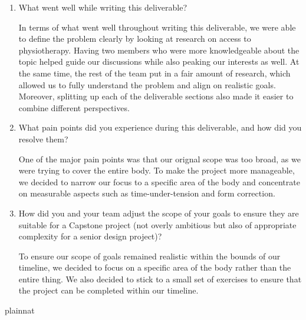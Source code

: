 \documentclass{article}
\begin{document}



\begin{enumerate}
    \item What went well while writing this deliverable? 

    In terms of what went well throughout writing this deliverable, we were able to define the problem 
    clearly by looking at research on access to physiotherapy. Having two members who were more knowledgeable 
    about the topic helped guide our discussions while also peaking our interests as well. At the same time, the 
    rest of the team put in a fair amount of research, which allowed us to fully understand the problem and align 
    on realistic goals. Moreover, splitting up each of the deliverable sections also made it easier to combine 
    different perspectives.

    \item What pain points did you experience during this deliverable, and how
    did you resolve them?

    One of the major pain points was that our orignal scope was too broad, as we were trying to cover the entire body. To 
    make the project more manageable, we decided to narrow our focus to a specific area of the body and concentrate on
    measurable aspects such as time-under-tension and form correction.

    \item How did you and your team adjust the scope of your goals to ensure
    they are suitable for a Capstone project (not overly ambitious but also of
    appropriate complexity for a senior design project)?

    To ensure our scope of goals remained realistic within the bounds of our timeline, we decided to focus on a specific area 
    of the body rather than the entire thing. We also decided to stick to a small set of exercises to ensure that the project
    can be completed within our timeline.
\end{enumerate}  

 {plainnat}

\end{document}
